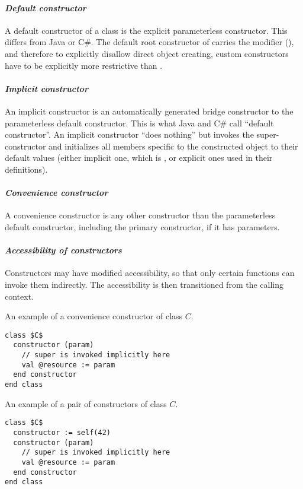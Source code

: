 \paragraph{\em Default constructor}
A default constructor of a class is the explicit parameterless constructor. This differs from Java or C\#. The default root constructor of  carries the modifier  (), and therefore to explicitly disallow direct object creating, custom constructors have to be explicitly more restrictive than . 

\paragraph{\em Implicit constructor}
An implicit constructor is an automatically generated bridge constructor to the parameterless default constructor. This is what Java and C\# call ``default constructor''. An implicit constructor ``does nothing'' but invokes the super-constructor and initializes all members specific to the constructed object to their default values (either implicit one, which is , or explicit ones used in their definitions). 

\paragraph{\em Convenience constructor}
A convenience constructor is any other constructor than the parameterless default constructor, including the primary constructor, if it has parameters. 

\paragraph{\em Accessibility of constructors}
Constructors may have modified accessibility, so that only certain functions can invoke them indirectly. The accessibility is then transitioned from the calling context. 

\example An example of a convenience constructor of class $C$.
\begin{lstlisting}
class $C$
  constructor (param)
    // super is invoked implicitly here
    val @resource := param
  end constructor
end class
\end{lstlisting}

\example An example of a pair of constructors of class $C$. 
\begin{lstlisting}
class $C$
  constructor := self(42)
  constructor (param)
    // super is invoked implicitly here
    val @resource := param
  end constructor
end class
\end{lstlisting}

